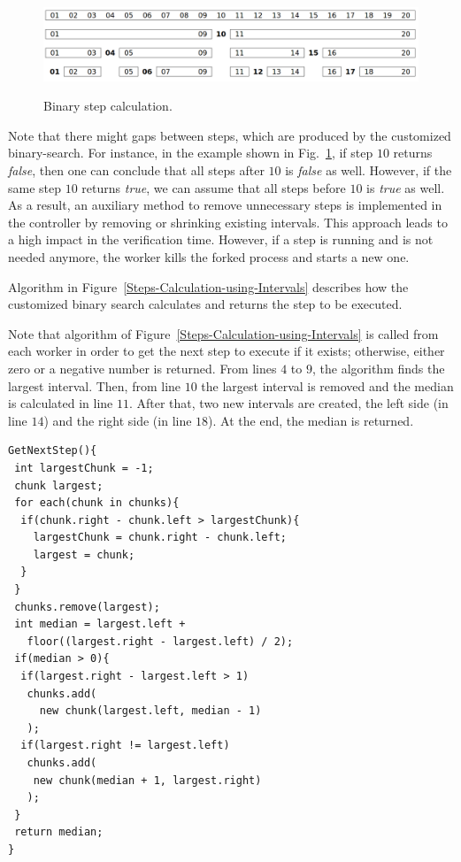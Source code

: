 \documentclass{doublecol-new}
\theoremstyle{TH}{
\newtheorem{lemma}{Lemma}
\newtheorem{theorem}[lemma]{Theorem}
\newtheorem{corrolary}[lemma]{Corrolary}
\newtheorem{conjecture}[lemma]{Conjecture}
\newtheorem{proposition}[lemma]{Proposition}
\newtheorem{claim}[lemma]{Claim}
\newtheorem{stheorem}[lemma]{Wrong Theorem}
\newtheorem{algorithm}{Algorithm}
}
\theoremstyle{THrm}{
\newtheorem{definition}{Definition}[section]
\newtheorem{question}{Question}[section]
\newtheorem{remark}{Remark}
\newtheorem{scheme}{Scheme}
}
\theoremstyle{THhit}{
\newtheorem{case}{Case}[section]
}
\begin{document}
\begin{figure}[h!]
	\caption{Binary step calculation.}
	\centering
	\includegraphics[scale=0.17]{figures/Fig4.png}	
	\label{Binary-Step-Calculation}
\end{figure}

Note that there might gaps between steps, which are produced by the customized binary-search. For instance, in the example shown in Fig.~\ref{Binary-Step-Calculation}, if step $10$ returns \textit{false}, then one can conclude that all steps after $10$ is \textit{false} as well. However, if the same step $10$ returns \textit{true}, we can assume that all steps before $10$ is \textit{true} as well. As a result, an auxiliary method to remove unnecessary steps is implemented in the controller by removing or shrinking existing intervals. This approach leads to a high impact in the verification time. However, if a step is running and is not needed anymore, the worker kills the forked process and starts a new one.

Algorithm in Figure~\ref{Steps-Calculation-using-Intervals} describes how the customized binary search calculates and returns the step to be executed. 

Note that algorithm of Figure~\ref{Steps-Calculation-using-Intervals} is called from each worker in order to get the next step to execute if it exists; otherwise, either zero or a negative number is returned.
From lines $4$ to $9$, the algorithm finds the largest interval. Then, from line $10$ the largest interval is removed and the median is calculated in line $11$. After that, two new intervals are created, the left side (in line $14$) and the right side (in line $18$). At the end, the median is returned.

\begin{lstlisting}[basicstyle=\footnotesize,caption={Steps calculation using intervals.},label={Steps-Calculation-using-Intervals},numbersep=7pt,frame=tb,captionpos=t,numberstyle=\tiny]
GetNextStep(){
 int largestChunk = -1;
 chunk largest;
 for each(chunk in chunks){
  if(chunk.right - chunk.left > largestChunk){
    largestChunk = chunk.right - chunk.left;
    largest = chunk;
  }
 }	
 chunks.remove(largest);	
 int median = largest.left + 
   floor((largest.right - largest.left) / 2);
 if(median > 0){
  if(largest.right - largest.left > 1)
   chunks.add(
     new chunk(largest.left, median - 1)
   );	
  if(largest.right != largest.left)
   chunks.add(
    new chunk(median + 1, largest.right)
   );
 }
 return median;
}
\end{lstlisting}
\end{document}
